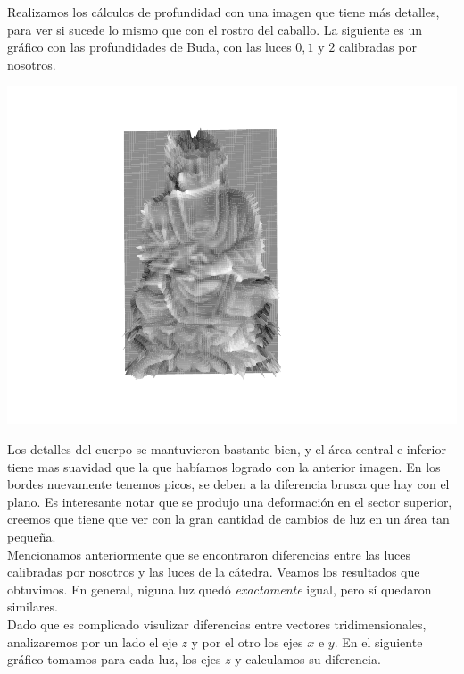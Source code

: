 Realizamos los cálculos de profundidad con una imagen que tiene más detalles, para ver si sucede lo mismo que con el rostro del caballo. La siguiente es un gráfico con las profundidades de Buda, con las luces $0, 1$ y $2$ calibradas por nosotros.

{\centering
    \includegraphics[scale=0.8]{informe/imagenes/profundidades/profundidadesBudaLucesPropias012.pdf} \\
}

Los detalles del cuerpo se mantuvieron bastante bien, y el área central e inferior tiene mas suavidad que la que habíamos logrado con la anterior imagen. En los bordes nuevamente tenemos picos, se deben a la diferencia brusca que hay con el plano. Es interesante notar que se produjo una deformación en el sector superior, creemos que tiene que ver con la gran cantidad de cambios de luz en un área tan pequeña. \\


\newpage
Mencionamos anteriormente que se encontraron diferencias entre las luces calibradas por nosotros y las luces  de la cátedra. Veamos los resultados que obtuvimos. En general, niguna luz quedó \textit{exactamente} igual, pero sí quedaron similares. \\

Dado que es complicado visulizar diferencias entre vectores tridimensionales, analizaremos por un lado el eje $z$ y por el otro los ejes $x$ e $y$. En el siguiente gráfico tomamos para cada luz, los ejes $z$ y calculamos su diferencia. \\

